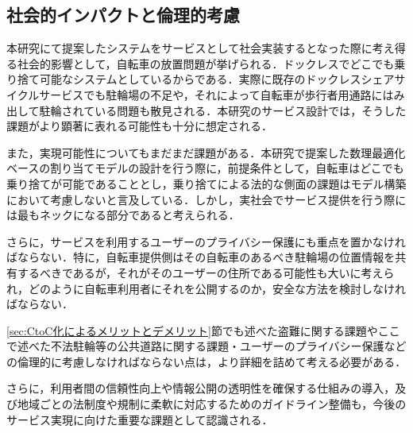   \subsection{社会的インパクトと倫理的考慮}
    \label{sec:社会的インパクトと倫理的考慮}
      \par 本研究にて提案したシステムをサービスとして社会実装するとなった際に考え得る社会的影響として，自転車の放置問題が挙げられる．ドックレスでどこでも乗り捨て可能なシステムとしているからである．実際に既存のドックレスシェアサイクルサービスでも駐輪場の不足や，それによって自転車が歩行者用通路にはみ出して駐輪されている問題も散見される．本研究のサービス設計では，そうした課題がより顕著に表れる可能性も十分に想定される．
      \par また，実現可能性についてもまだまだ課題がある．本研究で提案した数理最適化ベースの割り当てモデルの設計を行う際に，前提条件として，自転車はどこでも乗り捨てが可能であることとし，乗り捨てによる法的な側面の課題はモデル構築において考慮しないと言及している．しかし，実社会でサービス提供を行う際には最もネックになる部分であると考えられる．
      \par さらに，サービスを利用するユーザーのプライバシー保護にも重点を置かなければならない．特に，自転車提供側はその自転車のあるべき駐輪場の位置情報を共有するべきであるが，それがそのユーザーの住所である可能性も大いに考えられ，どのように自転車利用者にそれを公開するのか，安全な方法を検討しなければならない．
      \par \ref{sec:CtoC化によるメリットとデメリット}節でも述べた盗難に関する課題やここで述べた不法駐輪等の公共道路に関する課題・ユーザーのプライバシー保護などの倫理的に考慮しなければならない点は，より詳細を詰めて考える必要がある．
      \par さらに，利用者間の信頼性向上や情報公開の透明性を確保する仕組みの導入，及び地域ごとの法制度や規制に柔軟に対応するためのガイドライン整備も，今後のサービス実現に向けた重要な課題として認識される．
